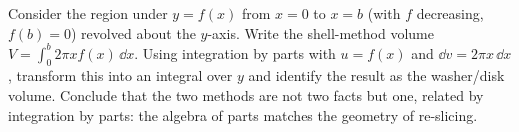 \begin{exercise}
Consider the region under $y=f(x)$ from $x=0$ to $x=b$ (with $f$ decreasing,
$f(b)=0$) revolved about the $y$-axis. Write the shell-method volume
$V = \int_0^b 2\pi x f(x)\,\dd x$. Using integration by parts with $u=f(x)$ and
$\dd v = 2\pi x\,\dd x$, transform this into an integral over $y$ and identify the
result as the washer/disk volume. Conclude that the two methods are not two facts
but one, related by integration by parts: the algebra of parts matches the
geometry of re-slicing.
\end{exercise}
